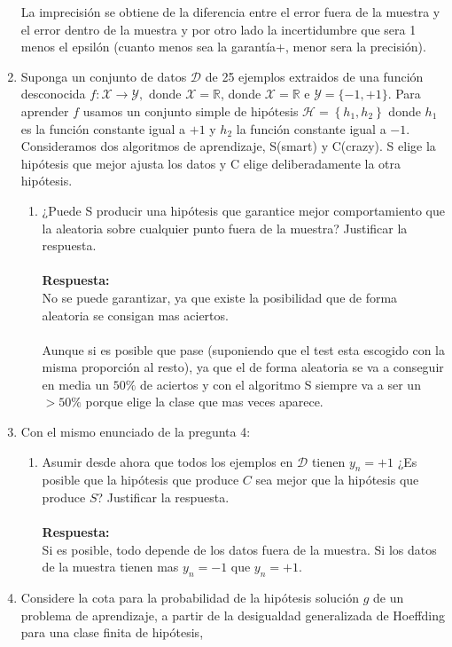 \documentclass[12pt,a4paper]{article}
\begin{document}
\begin{enumerate}
	 La  imprecisión se obtiene de la diferencia entre el error  fuera de la muestra y el error dentro de la muestra y por otro lado la incertidumbre que sera 1  menos el epsilón (cuanto menos sea la garantía+, menor sera la precisión). 
	 \item Suponga un conjunto de datos $\mathcal{D}$ de 25 ejemplos extraidos de una función desconocida $
	 f : \mathcal{X} \rightarrow \mathcal{Y}, \text { donde } \mathcal{X}=\mathbb{R}
	 $, donde $\mathcal{X}=\mathbb{R}$ e $\mathcal{Y}=\{-1,+1\}$. Para aprender $f$ usamos un conjunto  simple de hipótesis $\mathcal{H}=\left\{h_{1}, h_{2}\right\}$ donde $h_1$ es la función constante igual a $+1$ y $h_2$ la función constante igual a $-1$. Consideramos dos algoritmos de aprendizaje, S(smart) y C(crazy). S elige la hipótesis que mejor ajusta los datos y C elige deliberadamente la otra hipótesis.
	  \begin{enumerate}
	  	\item  ¿Puede S producir una hipótesis que garantice mejor comportamiento que la aleatoria
	  	sobre cualquier punto fuera de la muestra? Justificar la respuesta.\\\\
	  	\textbf{Respuesta: }\\
	  	No se puede garantizar, ya que existe la posibilidad que de forma aleatoria se consigan mas aciertos.\\\\ Aunque si es posible que pase (suponiendo que el test esta escogido con la misma proporción al resto), ya que el de forma aleatoria se va a conseguir en media un $50\%$ de aciertos y con el algoritmo S siempre va a ser un $>50\%$ porque elige la clase que mas veces aparece. 
	  \end{enumerate}
	  \item Con el mismo enunciado de la pregunta 4:
	  \begin{enumerate}
	  	\item Asumir desde ahora que todos los ejemplos en $\mathcal{D}$ tienen $y_n = +1$ ¿Es posible que la hipótesis  que produce $C$ sea mejor que la hipótesis que produce $S$? Justificar la respuesta.\\\\
	  	\textbf{Respuesta: }\\
	  	Si es posible,  todo depende de los datos fuera de la muestra. Si los datos de la muestra tienen mas $y_n = -1$ que $y_n = +1 $.
	  \end{enumerate}
  \item Considere la cota para la probabilidad de la hipótesis  solución $g$ de un problema de aprendizaje, a partir de la desigualdad generalizada de Hoeffding para una clase finita de hipótesis, $$
$$
\end{enumerate}
\end{document}

